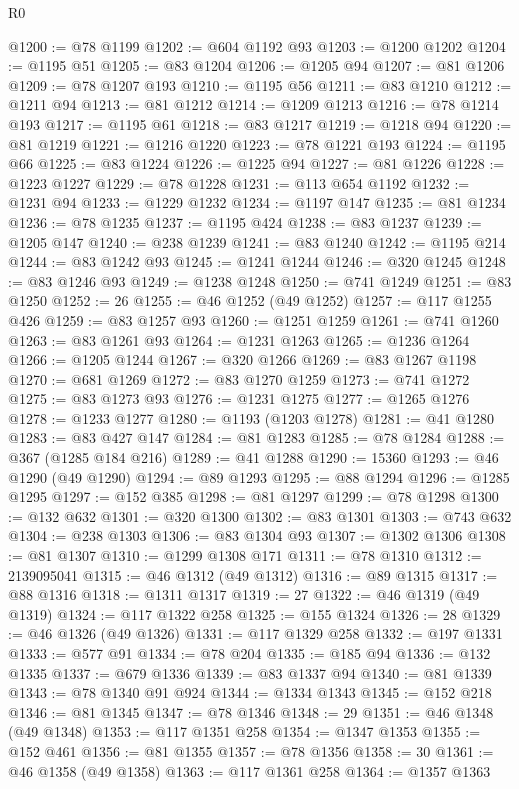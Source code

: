 \begin{lexlean}{R0}
\begin{coremodule}
@1200 := @78 @1199
@1202 := @604 @1192 @93
@1203 := @1200 @1202
@1204 := @1195 @51
@1205 := @83 @1204
@1206 := @1205 @94
@1207 := @81 @1206
@1209 := @78 @1207 @193
@1210 := @1195 @56
@1211 := @83 @1210
@1212 := @1211 @94
@1213 := @81 @1212
@1214 := @1209 @1213
@1216 := @78 @1214 @193
@1217 := @1195 @61
@1218 := @83 @1217
@1219 := @1218 @94
@1220 := @81 @1219
@1221 := @1216 @1220
@1223 := @78 @1221 @193
@1224 := @1195 @66
@1225 := @83 @1224
@1226 := @1225 @94
@1227 := @81 @1226
@1228 := @1223 @1227
@1229 := @78 @1228
@1231 := @113 @654 @1192
@1232 := @1231 @94
@1233 := @1229 @1232
@1234 := @1197 @147
@1235 := @81 @1234
@1236 := @78 @1235
@1237 := @1195 @424
@1238 := @83 @1237
@1239 := @1205 @147
@1240 := @238 @1239
@1241 := @83 @1240
@1242 := @1195 @214
@1244 := @83 @1242 @93
@1245 := @1241 @1244
@1246 := @320 @1245
@1248 := @83 @1246 @93
@1249 := @1238 @1248
@1250 := @741 @1249
@1251 := @83 @1250
@1252 := 26
@1255 := @46 @1252 (@49 @1252)
@1257 := @117 @1255 @426
@1259 := @83 @1257 @93
@1260 := @1251 @1259
@1261 := @741 @1260
@1263 := @83 @1261 @93
@1264 := @1231 @1263
@1265 := @1236 @1264
@1266 := @1205 @1244
@1267 := @320 @1266
@1269 := @83 @1267 @1198
@1270 := @681 @1269
@1272 := @83 @1270 @1259
@1273 := @741 @1272
@1275 := @83 @1273 @93
@1276 := @1231 @1275
@1277 := @1265 @1276
@1278 := @1233 @1277
@1280 := @1193 (@1203 @1278)
@1281 := @41 @1280
@1283 := @83 @427 @147
@1284 := @81 @1283
@1285 := @78 @1284
@1288 := @367 (@1285 @184 @216)
@1289 := @41 @1288
@1290 := 15360
@1293 := @46 @1290 (@49 @1290)
@1294 := @89 @1293
@1295 := @88 @1294
@1296 := @1285 @1295
@1297 := @152 @385
@1298 := @81 @1297
@1299 := @78 @1298
@1300 := @132 @632
@1301 := @320 @1300
@1302 := @83 @1301
@1303 := @743 @632
@1304 := @238 @1303
@1306 := @83 @1304 @93
@1307 := @1302 @1306
@1308 := @81 @1307
@1310 := @1299 @1308 @171
@1311 := @78 @1310
@1312 := 2139095041
@1315 := @46 @1312 (@49 @1312)
@1316 := @89 @1315
@1317 := @88 @1316
@1318 := @1311 @1317
@1319 := 27
@1322 := @46 @1319 (@49 @1319)
@1324 := @117 @1322 @258
@1325 := @155 @1324
@1326 := 28
@1329 := @46 @1326 (@49 @1326)
@1331 := @117 @1329 @258
@1332 := @197 @1331
@1333 := @577 @91
@1334 := @78 @204
@1335 := @185 @94
@1336 := @132 @1335
@1337 := @679 @1336
@1339 := @83 @1337 @94
@1340 := @81 @1339
@1343 := @78 @1340 @91 @924
@1344 := @1334 @1343
@1345 := @152 @218
@1346 := @81 @1345
@1347 := @78 @1346
@1348 := 29
@1351 := @46 @1348 (@49 @1348)
@1353 := @117 @1351 @258
@1354 := @1347 @1353
@1355 := @152 @461
@1356 := @81 @1355
@1357 := @78 @1356
@1358 := 30
@1361 := @46 @1358 (@49 @1358)
@1363 := @117 @1361 @258
@1364 := @1357 @1363

\end{coremodule}
\end{lexlean}
